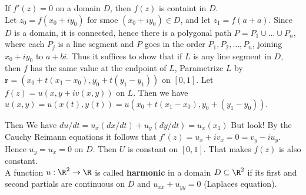 \documentclass{article}
\begin{document}
 If $f'(z) = 0$ on a domain $D$, then $f(z)$ is containt in $D$. \\

 Let $z_0 = f(x_0+iy_0)$ for smoe $(x_0+ iy_0)\in D$, and let $z_1 = f(a + a)$. Since $D$ is a domain, it is connected, hence there is a polygonal path $P = P_1\cup...\cup P_n$, where each $P_j$ is a line segment and $P$ goes in the order $P_1,P_2,\dots, P_n$, joining $x_0 + iy_0$ to $a+bi$. Thus it suffices to show that if $L$ is any line segment in $D$, then $f$ has the same value at the endpoint of $L$, Parametrize $L$ by $\mathbf{r} = (x_0+t(x_1-x_0), y_0+ t(y_1- y_1))$ on $[0,1]$. Let $f(z) = u(x,y + iv(x,y))$ on $L$. Then we have $u(x,y) = u(x(t),y(t)) = u(x_0+ t(x_1-x_0), y_0+(y_1-y_0)).$ 

Then We have $du/dt = u_x(dx/dt) + u_y(dy/dt) = u_x(x_1)$ But look! By the Cauchy Reimann equations it follows that $f'(z) = u_x + iv_x = 0 = v_y- iu_y.$ Hence $u_y = u_x = 0$ on $D$. Then $U$ is constant on $[0,1].$ That makes $f(z)$ is also constant. \\

 A function $u:\R^2\rightarrow \R$ is called \textbf{harmonic} in a domain $D\subseteq\R^2$ if its first and second partials are continuous on $D$ and $u_{xx} + u_{yy} = 0$ (Laplaces equation). 
\end{document}
